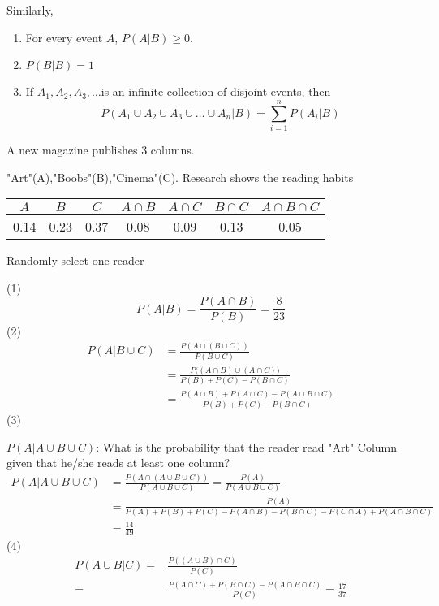 Similarly,
\begin{enumerate}
\item  For every event $A$, $P(A|B)\geq 0$.
\item  $P(B|B)=1$
\item  If $A_1, A_2,A_3,\dots$is an infinite collection of disjoint events, then 
\[  P(A_1 \cup A_2\cup A_3 \cup \dots\cup A_n|B)=\sum_{i=1}^{n}P(A_i|B) \]
\end{enumerate}

\begin{exmp}
A new magazine publishes 3 columns.

"Art"(A),"Boobs"(B),"Cinema"(C).
Research shows the reading habits

\begin{center}
\begin{tabular}{ccccccc}
\hline
$A$ & $B$ & $C$ & $A\cap B$ & $A\cap C$ & $B\cap C$ & $A \cap B\cap C$\\
\hline
0.14&0.23&0.37&0.08&0.09&0.13&0.05\\
\hline
\end{tabular}
\end{center}

Randomly select one reader

(1)
\[P(A|B)=\frac{P(A \cap B)}{P(B)}=\boxed{\frac{8}{23}}\]
(2)
\begin{align*}
P(A|B\cup C)&=\frac{P(A\cap (B\cup C) )}{P(B\cup C)}\\
&=\frac{P\big( (A\cap B)\cup(A \cap C) \big)}{P(B)+P(C)-P(B \cap C)}\\
&=\frac{P(A\cap B)+P(A\cap C)-P(A\cap B\cap C)}{P(B)+P(C)-P(B \cap C)}
\end{align*}
(3)

$P(A|A \cup B \cup C)$: What is the probability that the reader read "Art" Column given that  he/she reads at least one column?
\begin{align*}
P(A|A \cup B \cup C)&=\frac{P(A \cap (A \cup B \cup C) )}{P(A \cup B \cup C)}=\frac{P(A)}{P(A \cup B \cup C)}\\
&=\frac{P(A)}{P(A)+P(B)+P(C)-P(A \cap B)-P(B \cap C)-P(C \cap A)+P(A \cap B \cap C)}\\
&=\boxed{\frac{14}{49}}
\end{align*}
(4)
\begin{align*}
P(A \cup B |C)=&\frac{P((A \cup B)\cap C)}{P(C)}\\
=&\frac{P(A \cap C) +P(B \cap C)-P(A \cap B \cap C)}{P(C)}=\boxed{\frac{17}{37}}
\end{align*}

\end{exmp}

